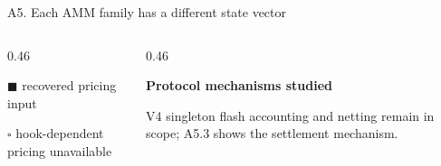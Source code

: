 \begin{frame}{A5. Each AMM family has a different state vector}
\begin{columns}[T,totalwidth=0.94\textwidth]
\begin{column}{0.46\textwidth}
\vspace{0.08cm}
{\scriptsize {\color{ink}$\blacksquare$} recovered pricing input\par}
{\scriptsize {\color{accent}$\square$} hook-dependent pricing unavailable\par}
\end{column}
\hfill
\begin{column}{0.46\textwidth}
{\small\bfseries\color{ucldark} Protocol mechanisms studied\par}
\vspace{0.08cm}
{\scriptsize V4 singleton flash accounting and netting remain in scope; A5.3 shows the settlement mechanism.\par}
\end{column}
\end{columns}
\end{frame}

